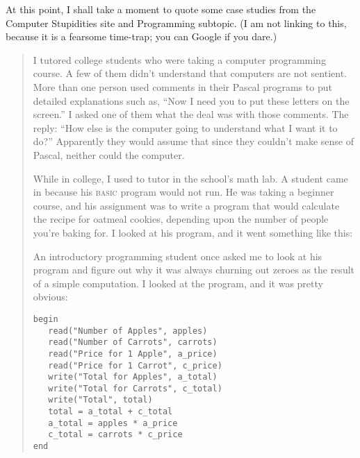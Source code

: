 {{
 At this point, I shall take a moment to quote some case studies
from the Computer Stupidities site and Programming subtopic. (I am not
linking to this, because it is a fearsome time-trap; you can Google if
you dare.)}

\begin{quote}
{
 I tutored college students who were taking a computer programming
course. A few of them didn't understand that computers
are not sentient. More than one person used comments in their Pascal
programs to put detailed explanations such as, ``Now I
need you to put these letters on the screen.'' I
asked one of them what the deal was with those comments. The reply:
``How else is the computer going to understand what I
want it to do?'' Apparently they would assume that
since they couldn't make sense of Pascal, neither could
the computer.}

\hr

{
 While in college, I used to tutor in the school's
math lab. A student came in because his \textsc{basic} program would not run. He
was taking a beginner course, and his assignment was to write a program
that would calculate the recipe for oatmeal cookies, depending upon the
number of people you're baking for. I looked at his
program, and it went something like this:}


\hr

{
 An introductory programming student once asked me to look at his
program and figure out why it was always churning out zeroes as the
result of a simple computation. I looked at the program, and it was
pretty obvious:}

\begin{verbatim}
begin
   read("Number of Apples", apples)
   read("Number of Carrots", carrots)
   read("Price for 1 Apple", a_price)
   read("Price for 1 Carrot", c_price)
   write("Total for Apples", a_total)
   write("Total for Carrots", c_total)
   write("Total", total)
   total = a_total + c_total
   a_total = apples * a_price
   c_total = carrots * c_price
end
\end{verbatim}


\end{quote}}
